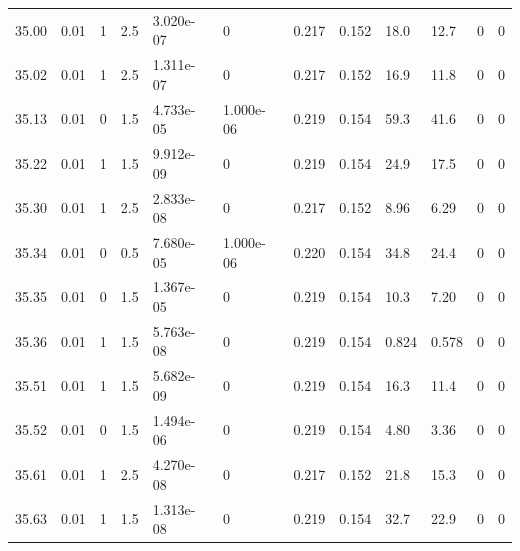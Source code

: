 \documentclass[preview]{standalone}
\begin{document}
{{{{{{{{{{{{{{{{\begin{tabular}{L{1.2cm}C{1.2cm} C{0.3cm}C{0.5cm} C{1.4cm}C{1.4cm} C{1.4cm}C{1.4cm} C{1.6cm}C{1.6cm} C{1.6cm}C{1.6cm}}
  35.00  &  0.01  & 1     & 2.5 &  3.020e-07  & 0  &  0.217&   0.152& 18.0 & 12.7   &  0 & 0  \\ 
  35.02  &  0.01  & 1     & 2.5 &  1.311e-07  & 0  &  0.217&   0.152& 16.9 & 11.8   &  0 & 0  \\ 
  35.13  &  0.01  & 0     & 1.5 &  4.733e-05  & 1.000e-06  &  0.219&   0.154& 59.3 & 41.6   &  0 & 0  \\ 
  35.22  &  0.01  & 1     & 1.5 &  9.912e-09  & 0  &  0.219&   0.154& 24.9 & 17.5   &  0 & 0  \\ 
  35.30  &  0.01  & 1     & 2.5 &  2.833e-08  & 0  &  0.217&   0.152& 8.96 & 6.29   &  0 & 0  \\ 
  35.34  &  0.01  & 0     & 0.5 &  7.680e-05  & 1.000e-06  &  0.220&   0.154& 34.8 & 24.4   &  0 & 0  \\ 
  35.35  &  0.01  & 0     & 1.5 &  1.367e-05  & 0  &  0.219&   0.154& 10.3 & 7.20   &  0 & 0  \\ 
  35.36  &  0.01  & 1     & 1.5 &  5.763e-08  & 0  &  0.219&   0.154& 0.824 & 0.578   &  0 & 0  \\ 
  35.51  &  0.01  & 1     & 1.5 &  5.682e-09  & 0  &  0.219&   0.154& 16.3 & 11.4   &  0 & 0  \\ 
  35.52  &  0.01  & 0     & 1.5 &  1.494e-06  & 0  &  0.219&   0.154& 4.80 & 3.36   &  0 & 0  \\ 
  35.61  &  0.01  & 1     & 2.5 &  4.270e-08  & 0  &  0.217&   0.152& 21.8 & 15.3   &  0 & 0  \\ 
  35.63  &  0.01  & 1     & 1.5 &  1.313e-08  & 0  &  0.219&   0.154& 32.7 & 22.9   &  0 & 0  \\ 
\hline 
\end{tabular} 

}}}}}}}}}}}}}}}}
\end{document}
